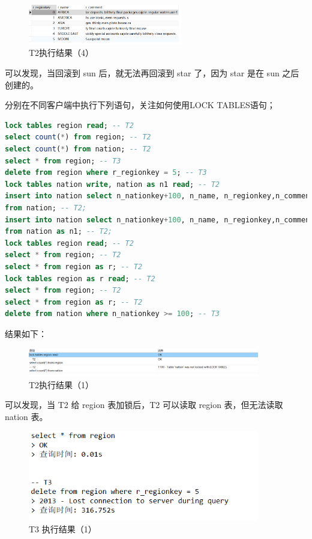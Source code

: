 \documentclass{article}
\begin{document}
\begin{figure}[H]
  \centering
  \includegraphics[width=0.6\textwidth]{img/28.png}
  \caption{T2执行结果（4）}
\end{figure}

可以发现，当回滚到 sun 后，就无法再回滚到 star 了，因为 star 是在 sun 之后创建的。

分别在不同客户端中执行下列语句，关注如何使用LOCK TABLES语句；

\begin{lstlisting}[language=sql]
lock tables region read; -- T2
select count(*) from region; -- T2
select count(*) from nation; -- T2
select * from region; -- T3
delete from region where r_regionkey = 5; -- T3
lock tables nation write, nation as n1 read; -- T2
insert into nation select n_nationkey+100, n_name, n_regionkey,n_comment
from nation; -- T2;
insert into nation select n_nationkey+100, n_name, n_regionkey,n_comment
from nation as n1; -- T2;
lock tables region read; -- T2
select * from region; -- T2
select * from region as r; -- T2
lock tables region as r read; -- T2
select * from region; -- T2
select * from region as r; -- T2
delete from nation where n_nationkey >= 100; -- T3
\end{lstlisting}

结果如下：

\begin{figure}[H]
  \centering
  \includegraphics[width=0.9\textwidth]{img/29.png}
  \caption{T2执行结果（1）}
\end{figure}

可以发现，当 T2 给 region 表加锁后，T2 可以读取 region 表，但无法读取 nation 表。

\begin{figure}[H]
  \centering
  \includegraphics[width=0.9\textwidth]{img/30.png}
  \caption{T3 执行结果（1）}
\end{figure}
\end{document}
